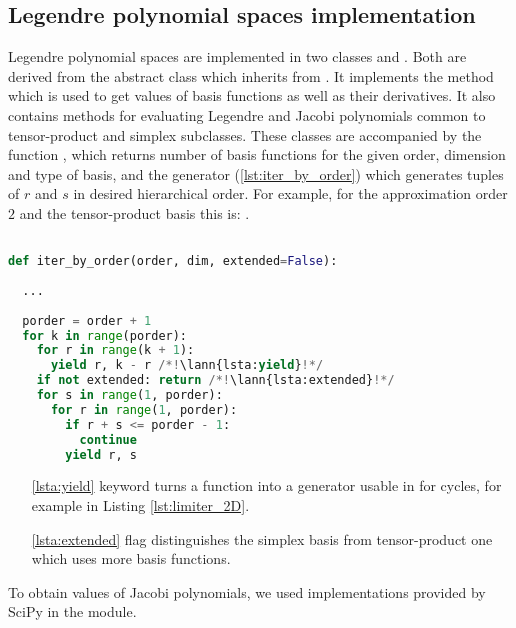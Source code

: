 \subsection{Legendre polynomial spaces implementation}
Legendre polynomial spaces are implemented in two classes
 and
. Both are derived from the abstract class
 which inherits from \sfepy{}
. It implements the method  which is used to get values of basis
functions as well as their derivatives. It also contains methods for evaluating Legendre and Jacobi
polynomials common to tensor-product and simplex subclasses. These classes are accompanied by the
function , which returns number of basis functions for the given order, dimension
and type of basis, and the generator  (\ref{lst:iter_by_order}) which generates
tuples of $r$ and $s$ in desired hierarchical order. For example, for the approximation order $2$ and the
tensor-product basis this is:
.
\setcounter{lstannotation}{0}
\begin{lstlisting}[language=Python, caption= Iteration over $r$ and $s$
indicies of basis functions \label{lst:iter_by_order}.]

def iter_by_order(order, dim, extended=False):
  
  ...
  
  porder = order + 1
  for k in range(porder):
    for r in range(k + 1):
      yield r, k - r /*!\lann{lsta:yield}!*/
    if not extended: return /*!\lann{lsta:extended}!*/
    for s in range(1, porder):
      for r in range(1, porder):
        if r + s <= porder - 1:
          continue
        yield r, s
\end{lstlisting}
\begin{itemize}
    \item[\ref{lsta:yield}]  keyword turns a function into a generator usable in for
    cycles, for example in Listing \ref{lst:limiter_2D}.
    \item[\ref{lsta:extended}]  flag distinguishes the simplex basis from
    tensor-product one which uses more basis functions.
\end{itemize}
To obtain values of Jacobi polynomials, we used implementations provided by SciPy in the
 module.


